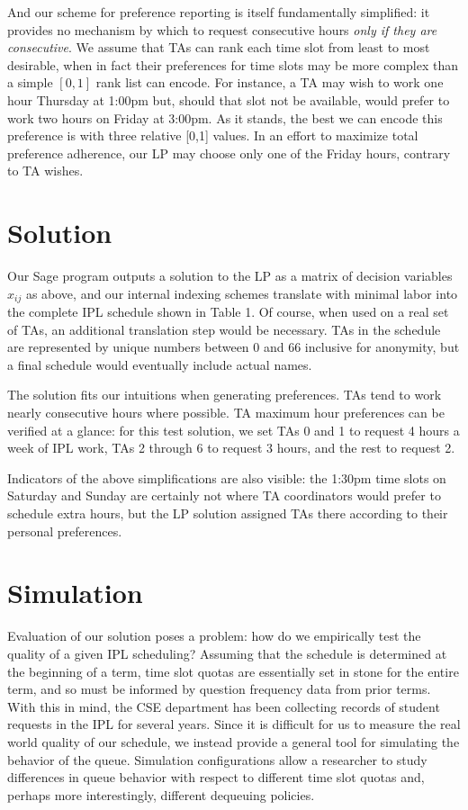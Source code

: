 \documentclass{article}
\begin{document}
\begin{multicols}{2}
And our scheme for preference reporting is itself fundamentally simplified: it provides no mechanism by which to request consecutive hours \textit{only if they are consecutive}. We assume that TAs can rank each time slot from least to most desirable, when in fact their preferences for time slots may be more complex than a simple $[0, 1]$ rank list can encode. For instance, a TA may wish to work one hour Thursday at 1:00pm but, should that slot not be available, would prefer to work two hours on Friday at 3:00pm. As it stands, the best we can encode this preference is with three relative [0,1] values. In an effort to maximize total preference adherence, our LP may choose only one of the Friday hours, contrary to TA wishes.

\section*{Solution}

Our Sage program outputs a solution to the LP as a matrix of decision variables $x_{ij}$ as above, and our internal indexing schemes translate with minimal labor into the complete IPL schedule shown in Table 1. Of course, when used on a real set of TAs, an additional translation step would be necessary. TAs in the schedule are represented by unique numbers between 0 and 66 inclusive for anonymity, but a final schedule would eventually include actual names.

The solution fits our intuitions when generating preferences. TAs tend to work nearly consecutive hours where possible. TA maximum hour preferences can be verified at a glance: for this test solution, we set TAs 0 and 1 to request 4 hours a week of IPL work, TAs 2 through 6 to request 3 hours, and the rest to request 2.

Indicators of the above simplifications are also visible: the 1:30pm time slots on Saturday and Sunday are certainly not where TA coordinators would prefer to schedule extra hours, but the LP solution assigned TAs there according to their personal preferences.

\section*{Simulation}

Evaluation of our solution poses a problem: how do we empirically test the quality of a given IPL scheduling? Assuming that the schedule is determined at the beginning of a term, time slot quotas are essentially set in stone for the entire term, and so must be informed by question frequency data from prior terms. With this in mind, the CSE department has been collecting records of student requests in the IPL for several years. Since it is difficult for us to measure the real world quality of our schedule, we instead provide a general tool for simulating the behavior of the queue. Simulation configurations allow a researcher to study differences in queue behavior with respect to different time slot quotas and, perhaps more interestingly, different dequeuing policies.


\end{multicols}
\end{document}
